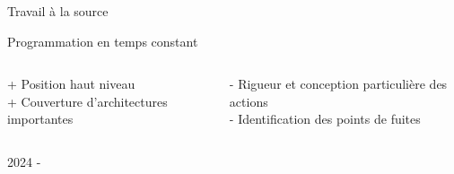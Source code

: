 \documentclass{backend/backend}
\begin{document}
\begin{frame}{Travail à la source}
        \centering

    \vfill
    \begin{blockSimple}{Programmation en temps constant}
        \begin{columns}
            \begin{column}{0.3\textwidth}
                + Position haut niveau\\
                + Couverture d'architectures importantes
            \end{column}
            \begin{column}{0.5\textwidth}
            - Rigueur et conception particulière des actions\\
            - Identification des points de fuites
            \end{column}
        \end{columns}        
    \end{blockSimple}

    \pause
    \begin{alertblock}{2024 - \citeauthor{schneider2024breakingbadcompilersbreak}}
    \end{alertblock}

\end{frame}
\end{document}
